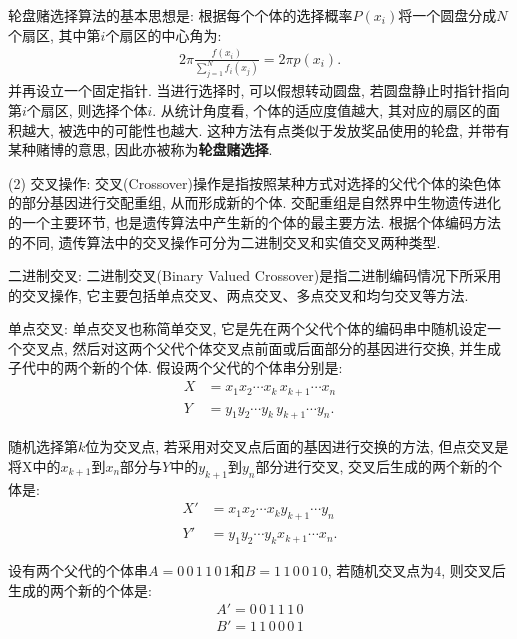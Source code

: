     轮盘赌选择算法的基本思想是: 根据每个个体的选择概率$P(x_i)$将一个圆盘分成$N$个扇区, 其中第$i$个扇区的中心角为:
\begin{align}
    2 \pi \frac{f\left(x_{i}\right)}{\sum_{j=1}^{N} f_{i}\left(x_{j}\right)}=2 \pi p\left(x_{i}\right).
\end{align}
并再设立一个固定指针. 当进行选择时, 可以假想转动圆盘, 若圆盘静止时指针指向第$i$个扇区, 则选择个体$i$.
从统计角度看, 个体的适应度值越大, 其对应的扇区的面积越大, 被选中的可能性也越大. 这种方法有点类似于发放奖品使用的轮盘, 并带有某种赌博的意思, 因此亦被称为\textbf{轮盘赌选择}.

(2) 交叉操作: 交叉(Crossover)操作是指按照某种方式对选择的父代个体的染色体的部分基因进行交配重组, 从而形成新的个体. 交配重组是自然界中生物遗传进化的一个主要环节, 也是遗传算法中产生新的个体的最主要方法. 根据个体编码方法的不同, 遗传算法中的交叉操作可分为二进制交叉和实值交叉两种类型.

     二进制交叉: 二进制交叉(Binary Valued Crossover)是指二进制编码情况下所采用的交叉操作, 它主要包括单点交叉、两点交叉、多点交叉和均匀交叉等方法.

     单点交叉: 单点交叉也称简单交叉, 它是先在两个父代个体的编码串中随机设定一个交叉点, 然后对这两个父代个体交叉点前面或后面部分的基因进行交换, 并生成子代中的两个新的个体. 假设两个父代的个体串分别是:
\begin{align*}
    X&=x_1 x_2 \cdots x_k\, x_{k+1} \cdots x_n\\
    Y&=y_1 y_2 \cdots y_k\,  y_{k+1} \cdots y_n.
\end{align*}

    随机选择第$k$位为交叉点, 若采用对交叉点后面的基因进行交换的方法, 但点交叉是将X中的$x_{k+1}$到$x_n$部分与$Y$中的$y_{k+1}$到$y_n$部分进行交叉, 交叉后生成的两个新的个体是:
\begin{align*}
    X'&= x_1 x_2 \cdots x_k y_{k+1} \cdots y_n\\
    Y'&= y_1 y_2 \cdots y_k x_{k+1} \cdots x_n.
\end{align*}
\begin{example}
    设有两个父代的个体串$A=0\, 0\,  1\,  1\,  0\,  1$和$B=1\,  1\,  0\,  0\,  1\,  0$, 若随机交叉点为4, 则交叉后生成的两个新的个体是:
\begin{align*}
    A'= 0\, 0\, 1\, 1\, 1\, 0\\
    B'= 1\, 1\, 0\, 0\, 0\, 1
\end{align*}
\vspace{-0.4cm}
\end{example}

